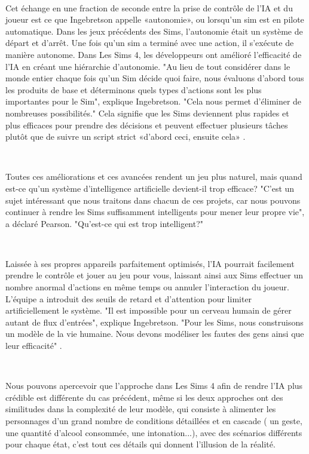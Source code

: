 ~\par
Cet échange en une fraction de seconde entre la prise de contrôle de l’IA et du joueur est ce que Ingebretson appelle «autonomie», ou lorsqu'un sim est en pilote automatique. Dans les jeux précédents des Sims, l’autonomie était un système de départ et d’arrêt. Une fois qu'un sim a terminé avec une action, il s'exécute de manière autonome. Dans Les Sims 4, les développeurs ont amélioré l'efficacité de l'IA en créant une hiérarchie d'autonomie. "Au lieu de tout considérer dans le monde entier chaque fois qu'un Sim décide quoi faire, nous évaluons d'abord tous les produits de base et déterminons quels types d’actions sont les plus importantes pour le Sim", explique Ingebretson. "Cela nous permet d'éliminer de nombreuses possibilités." Cela signifie que les Sims deviennent plus rapides et plus efficaces pour prendre des décisions et peuvent effectuer plusieurs tâches plutôt que de suivre un script strict «d'abord ceci, ensuite cela» \parencite{simsArticle}.

~\par
Toutes ces améliorations et ces avancées rendent un jeu plus naturel, mais quand est-ce qu’un système d'intelligence artificielle devient-il trop efficace? "C'est un sujet intéressant que nous traitons dans chacun de ces projets, car nous pouvons continuer à rendre les Sims suffisamment intelligents pour mener leur propre vie", a déclaré Pearson. "Qu'est-ce qui est trop intelligent?"

~\par

Laissée à ses propres appareils parfaitement optimisés, l'IA pourrait facilement prendre le contrôle et jouer au jeu pour vous, laissant ainsi aux Sims effectuer un nombre anormal d'actions en même temps ou annuler l'interaction du joueur. L’équipe a introduit des seuils de retard et d’attention pour limiter artificiellement le système. "Il est impossible pour un cerveau humain de gérer autant de flux d'entrées", explique Ingebretson. "Pour les Sims, nous construisons un modèle de la vie humaine. Nous devons modéliser les fautes des gens ainsi que leur efficacité" \parencite{simsArticle}. 

~\par
Nous pouvons apercevoir que l'approche dans Les Sims 4 afin de rendre l’IA plus crédible est différente du cas précédent, même si les deux approches ont des similitudes dans la complexité de leur modèle, qui consiste à alimenter les personnages d’un grand nombre de conditions détaillées et en cascade ( un geste, une quantité d’alcool consommée, une intonation...), avec des scénarios différents pour chaque état, c’est tout ces détails qui donnent l’illusion de la réalité.

